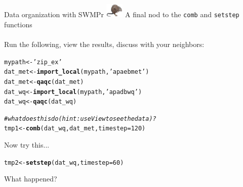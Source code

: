 \documentclass[xcolor=dvipsnames]{beamer}\usepackage[]{graphicx}\usepackage[]{color}
\makeatletter
\newcommand{\hlnum}[1]{\textcolor[rgb]{0.686,0.059,0.569}{#1}}%
\newcommand{\hlstr}[1]{\textcolor[rgb]{0.192,0.494,0.8}{#1}}%
\newcommand{\hlcom}[1]{\textcolor[rgb]{0.678,0.584,0.686}{\textit{#1}}}%
\newcommand{\hlstd}[1]{\textcolor[rgb]{0.345,0.345,0.345}{#1}}%
\newcommand{\hlkwb}[1]{\textcolor[rgb]{0.69,0.353,0.396}{#1}}%
\newcommand{\hlkwc}[1]{\textcolor[rgb]{0.333,0.667,0.333}{#1}}%
\newcommand{\hlkwd}[1]{\textcolor[rgb]{0.737,0.353,0.396}{\textbf{#1}}}%
\newenvironment{kframe}{%
 \def\at@end@of@kframe{}%
 \ifinner\ifhmode%
  \def\at@end@of@kframe{\end{minipage}}%
  \begin{minipage}{\columnwidth}%
 \fi\fi%
 \def\FrameCommand##1{\hskip\@totalleftmargin \hskip-\fboxsep
 \colorbox{shadecolor}{##1}\hskip-\fboxsep
     \hskip-\linewidth \hskip-\@totalleftmargin \hskip\columnwidth}%
 \MakeFramed {\advance\hsize-\width
   \@totalleftmargin\z@ \linewidth\hsize
   \@setminipage}}%
 {\par\unskip\endMakeFramed%
 \at@end@of@kframe}
\newenvironment{knitrout}{}{} %
\makeatother
\begin{document}
\begin{frame}[fragile]{Data organization with SWMPr \includegraphics[width = 0.065\textwidth]{imgs/swmprat.png}}
\onslide<+->
A final nod to the \texttt{comb} and \texttt{setstep} functions \\~\\
Run the following, view the results, discuss with your neighbors:
\begin{knitrout}\scriptsize
{}\color{fgcolor}\begin{kframe}
\begin{alltt}
\hlstd{mypath} \hlkwb{<-} \hlstr{'zip_ex'}
\hlstd{dat_met} \hlkwb{<-} \hlkwd{import_local}\hlstd{(mypath,} \hlstr{'apaebmet'}\hlstd{)}
\hlstd{dat_met} \hlkwb{<-} \hlkwd{qaqc}\hlstd{(dat_met)}
\hlstd{dat_wq} \hlkwb{<-} \hlkwd{import_local}\hlstd{(mypath,} \hlstr{'apadbwq'}\hlstd{)}
\hlstd{dat_wq} \hlkwb{<-} \hlkwd{qaqc}\hlstd{(dat_wq)}

\hlcom{# what does this do (hint: use View to see the data)?}
\hlstd{tmp1} \hlkwb{<-} \hlkwd{comb}\hlstd{(dat_wq, dat_met,} \hlkwc{timestep} \hlstd{=} \hlnum{120}\hlstd{)}
\end{alltt}
\end{kframe}
\end{knitrout}
\onslide<+->
Now try this...
\begin{knitrout}\scriptsize
{}\color{fgcolor}\begin{kframe}
\begin{alltt}
\hlstd{tmp2} \hlkwb{<-} \hlkwd{setstep}\hlstd{(dat_wq,} \hlkwc{timestep} \hlstd{=} \hlnum{60}\hlstd{)}
\end{alltt}
\end{kframe}
\end{knitrout}
What happened?
\end{frame}
\end{document}
